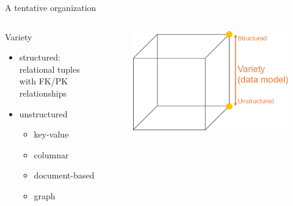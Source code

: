 \begin{frame}[allowframebreaks]{A tentative organization}
\begin{columns}
\begin{column}{0.5\textwidth}
Variety
\begin{itemize}
\item structured: relational tuples with FK/PK relationships
\item unstructured
\begin{itemize}
    \item key-value
    \item columnar
    \item document-based
    \item graph
\end{itemize}
\end{itemize}
\end{column}
\begin{column}{0.5\textwidth}
\begin{figure}
\centering
\includegraphics[scale=.4]{imgs/bigdatacube2.pdf}
\end{figure}
\end{column}
\end{columns}

\framebreak


\end{frame}
